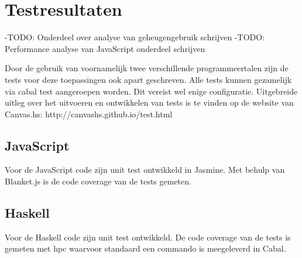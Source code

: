 \section{Testresultaten} \label{sec:testresultaten}

-TODO: Onderdeel over analyse van geheugengebruik schrijven
-TODO: Performance analyse van JavaScript onderdeel schrijven

Door de gebruik van voornamelijk twee verschillende programmeertalen zijn de tests voor deze toepassingen ook apart geschreven. Alle tests kunnen gezamelijk via cabal test aangeroepen worden. Dit vereist wel enige configuratie. Uitgebreide uitleg over het uitvoeren en ontwikkelen van tests is te vinden op de website van Canvas.hs: http://canvashs.github.io/test.html

\subsection{JavaScript}
Voor de JavaScript code zijn unit test ontwikkeld in Jasmine. Met behulp van Blanket.js is de code coverage van de tests gemeten.

\subsection{Haskell}
Voor de Haskell code zijn unit test ontwikkeld. De code coverage van de tests is gemeten met hpc waarvoor standaard een commando is meegeleverd in Cabal.

